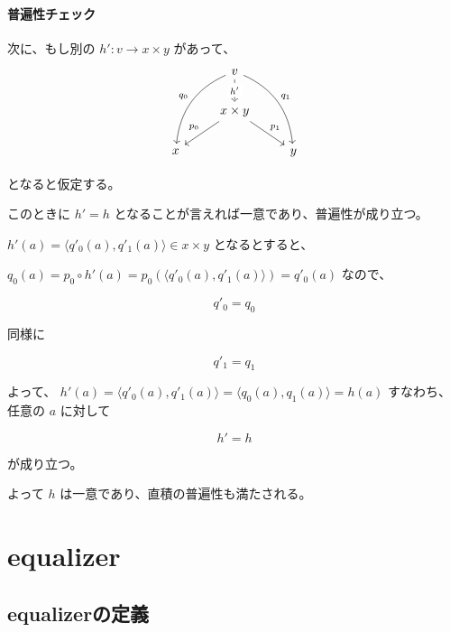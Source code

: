 \documentclass[uplatex,a4j,12pt,dvipdfmx]{jsarticle}
\begin{document}
\paragraph{普遍性チェック}

次に、もし別の $h':v \to x \times y$ があって、
\[
	\begin{tikzcd}
		& v \arrow[ldd, "q_{0}"', bend right] \arrow[rdd, "q_{1}", bend left] \arrow[d, "h'" description, dashed] &   \\
		& x \times y \arrow[ld, "p_{0}"'] \arrow[rd, "p_{1}"]                                                     &   \\
		x &                                                                                                         & y
	\end{tikzcd}
\]

となると仮定する。

このときに $h'=h$ となることが言えれば一意であり、普遍性が成り立つ。

$h'(a) = \langle q'_{0}(a) , q'_{1}(a) \rangle \in x \times y$ となるとすると、

$q_{0}(a) = p_{0} \circ h'(a) = p_{0} (\langle q'_{0}(a) , q'_{1}(a) \rangle) = q'_{0}(a)$
なので、

$$q'_{0} = q_{0}$$

同様に

$$q'_{1} = q_{1}$$

よって、
$h'(a) = \langle q'_{0}(a) , q'_{1}(a) \rangle = \langle q_{0}(a) , q_{1}(a) \rangle = h(a)$
すなわち、任意の $a$ に対して

$$h' = h$$

が成り立つ。

よって $h$ は一意であり、直積の普遍性も満たされる。


\section{equalizer}

\subsection{equalizerの定義}
\end{document}
